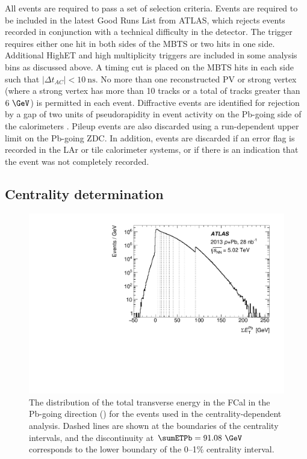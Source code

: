 All events are required to pass a set of \minbias selection criteria.
Events are required to be included in the latest Good Runs List from ATLAS, which rejects events recorded in conjunction with a technical difficulty in the detector.
The \minbias trigger requires either one hit in both sides of the \ac{MBTS} or two hits in one side.
Additional \ac{HighET} and high multiplicity triggers are included in some analysis bins as discussed above.
A timing cut is placed on the \ac{MBTS} hits in each side such that $|\Delta t_{AC}| < 10~\textrm{ns}$.
No more than one reconstructed \ac{PV} or strong vertex (where a strong vertex has more than 10 tracks or a total \pt of tracks greater than $6~\GeV$) is permitted in each event.
Diffractive events are identified for rejection by a gap of two units of pseudorapidity in event activity on the Pb-going side of the calorimeters \cite{HION-2012-15}.
Pileup events are also discarded using a run-dependent upper limit on the Pb-going \ac{ZDC}.
In addition, events are discarded if an error flag is recorded in the \ac{LAr} or tile calorimeter systems, or if there is an indication that the event was not completely recorded.

\subsection{Centrality determination}

\begin{figure}[t]
\includegraphics{fcal_et_total.pdf}
\caption{The distribution of the total transverse energy in the \ac{FCal} in the Pb-going direction (\sumETPb) for the events used in the centrality-dependent analysis. Dashed lines are shown at the boundaries of the centrality intervals, and the discontinuity at $\sumETPb = 91.08~\GeV$ corresponds to the lower \sumETPb boundary of the 0--1\% centrality interval.}
\label{fig:fcal_et}
\end{figure}

